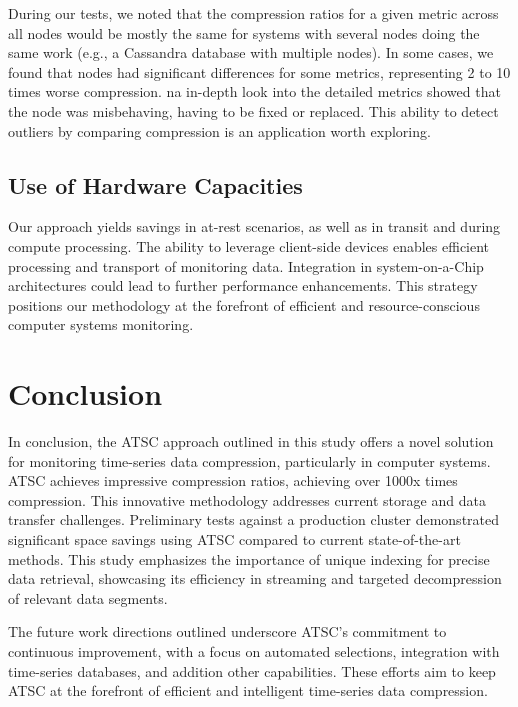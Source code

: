 \documentclass[conference]{IEEEtran}
\begin{document}
During our tests, we noted that the compression ratios for a given metric across all nodes would be mostly the same for systems with several nodes doing the same work (e.g., a Cassandra database with multiple nodes).
In some cases, we found that nodes had significant differences for some metrics, representing 2 to 10 times worse compression. na in-depth look into the detailed metrics showed that the node was misbehaving, having to be fixed 
or replaced. This ability to detect outliers by comparing compression is an application worth exploring.

\subsection{Use of Hardware Capacities}

Our approach yields savings in at-rest scenarios, as well as in transit and during compute processing. The ability to leverage client-side devices enables efficient processing and transport of monitoring data. Integration in system-on-a-Chip architectures could lead to further performance enhancements. This strategy positions our methodology at the forefront of efficient and resource-conscious computer systems monitoring.

\section{Conclusion}

In conclusion, the ATSC approach outlined in this study offers a novel solution for monitoring time-series data compression, particularly in computer systems. ATSC achieves impressive compression ratios, achieving over 1000x times compression. This innovative methodology addresses current storage and data transfer challenges.
\vspace{5pt}
Preliminary tests against a production cluster demonstrated significant space savings using ATSC compared to current state-of-the-art methods. This study emphasizes the importance of unique indexing for precise data retrieval, showcasing its efficiency in streaming and targeted decompression of relevant data segments.

The future work directions outlined underscore ATSC's commitment to continuous improvement, with a focus on automated selections, integration with time-series databases, and addition other capabilities. These efforts aim to keep ATSC at the forefront of efficient and intelligent time-series data compression.


\end{document}
